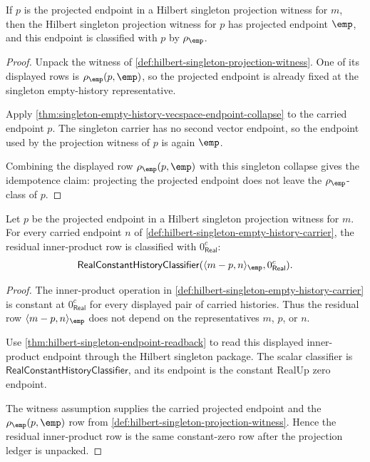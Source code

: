 \begin{theorem}
\label{thm:hilbert-singleton-projection-idempotent}
If $p$ is the projected endpoint in a Hilbert singleton projection witness
for $m$, then the Hilbert singleton projection witness for $p$ has projected
endpoint $\emp$, and this endpoint is classified with $p$ by $\rho_{\emp}$.
\end{theorem}
\begin{proof}
Unpack the witness of
\autoref{def:hilbert-singleton-projection-witness}. One of its displayed
rows is $\rho_{\emp}(p,\emp)$, so the projected endpoint is already fixed at
the singleton empty-history representative.

Apply
\autoref{thm:singleton-empty-history-vecspace-endpoint-collapse} to the
carried endpoint $p$. The singleton carrier has no second vector endpoint, so
the endpoint used by the projection witness of $p$ is again $\emp$.

Combining the displayed row $\rho_{\emp}(p,\emp)$ with this singleton
collapse gives the idempotence claim: projecting the projected endpoint does
not leave the $\rho_{\emp}$-class of $p$.
\end{proof}

\begin{theorem}
\label{thm:hilbert-singleton-projection-orthogonal-zero}
Let $p$ be the projected endpoint in a Hilbert singleton projection witness
for $m$. For every carried endpoint $n$ of
\autoref{def:hilbert-singleton-empty-history-carrier}, the residual
inner-product row is classified with $0_{\mathsf{Real}}^{c}$:
$$
\mathsf{RealConstantHistoryClassifier}
  (\langle m-p,n\rangle_{\emp},0_{\mathsf{Real}}^{c}).
$$
\end{theorem}
\begin{proof}
The inner-product operation in
\autoref{def:hilbert-singleton-empty-history-carrier} is constant at
$0_{\mathsf{Real}}^{c}$ for every displayed pair of carried histories. Thus
the residual row $\langle m-p,n\rangle_{\emp}$ does not depend on the
representatives $m$, $p$, or $n$.

Use \autoref{thm:hilbert-singleton-endpoint-readback} to read this displayed
inner-product endpoint through the Hilbert singleton package. The scalar
classifier is $\mathsf{RealConstantHistoryClassifier}$, and its endpoint is
the constant RealUp zero endpoint.

The witness assumption supplies the carried projected endpoint and the
$\rho_{\emp}(p,\emp)$ row from
\autoref{def:hilbert-singleton-projection-witness}. Hence the residual
inner-product row is the same constant-zero row after the projection ledger is
unpacked.
\end{proof}

